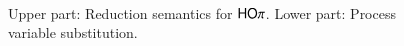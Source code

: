\begin{figure}[t!]
\[\begin{array}{c}
\begin{array}{rclcrcl}
		\end{array}
	\end{array}
\]
	\caption{Upper part: Reduction semantics for $\mathsf{HO}\pi$. Lower part: Process variable substitution. \label{fig:reduction}}
\end{figure}
